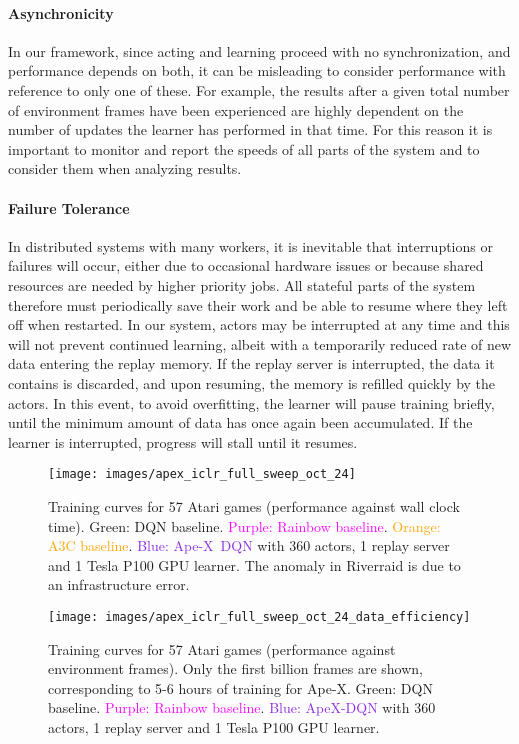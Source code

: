 \documentclass{article} \PassOptionsToPackage{usenames,dvipsnames}{xcolor}
\def\apex{Ape-X}
\def\smallcaption#1{\caption{\small #1}\vspace{-0.4cm}}
\begin{document}
\paragraph{Asynchronicity}

In our framework, since acting and learning proceed with no synchronization, and performance depends on both, it can be misleading to consider performance with reference to only one of these. For example, the results after a given total number of environment frames have been experienced are highly dependent on the number of updates the learner has performed in that time. For this reason it is important to monitor and report the speeds of all parts of the system and to consider them when analyzing results.

\paragraph{Failure Tolerance}

In distributed systems with many workers, it is inevitable that interruptions or failures will occur, either due to occasional hardware issues or because shared resources are needed by higher priority jobs. All stateful parts of the system therefore must periodically save their work and be able to resume where they left off when restarted. In our system, actors may be interrupted at any time and this will not prevent continued learning, albeit with a temporarily reduced rate of new data entering the replay memory. If the replay server is interrupted, the data it contains is discarded, and upon resuming, the memory is refilled quickly by the actors. In this event, to avoid overfitting, the learner will pause training briefly, until the minimum amount of data has once again been accumulated. If the learner is interrupted, progress will stall until it resumes.


\begin{figure}
    \centering
    \texttt{[image: images/apex\_iclr\_full\_sweep\_oct\_24]}
    \smallcaption{Training curves for 57 Atari games (performance against wall clock time). \textcolor{OliveGreen}{Green: DQN baseline}. \textcolor{Fuchsia}{Purple: Rainbow baseline}. \textcolor{orange}{Orange: A3C baseline}. \textcolor{BlueViolet}{Blue: \apex\ DQN} with 360 actors, 1 replay server and 1 Tesla P100 GPU learner. The anomaly in Riverraid is due to an infrastructure error.}
    \label{fig:atari_57_games}
\end{figure}

\begin{figure}
    \centering
    \texttt{[image: images/apex\_iclr\_full\_sweep\_oct\_24\_data\_efficiency]} 
    \smallcaption{Training curves for 57 Atari games (performance against environment frames). Only the first billion frames are shown, corresponding to 5-6 hours of training for \apex. \textcolor{OliveGreen}{Green: DQN baseline}. \textcolor{Fuchsia}{Purple: Rainbow baseline}. \textcolor{BlueViolet}{Blue: ApeX-DQN} with 360 actors, 1 replay server and 1 Tesla P100 GPU learner.}
    \label{fig:atari_57_games_data_efficiency}
\end{figure}
\end{document}
